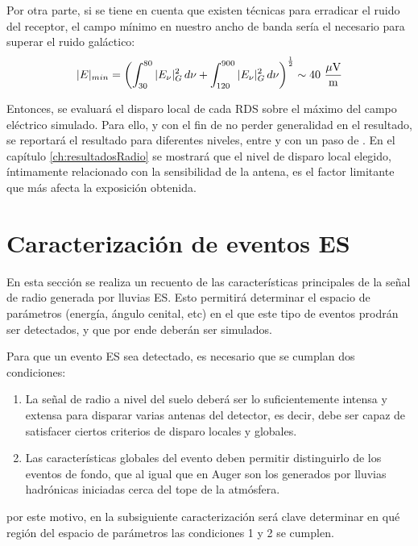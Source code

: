 	Por otra parte, si se tiene en cuenta que existen t\'ecnicas para erradicar el ruido del receptor, el campo m\'inimo en nuestro ancho de banda ser\'ia el necesario para superar el ruido gal\'actico:
	\begin{equation}
	|E|_{min}=\left(\int_{30}^{80}|E_\nu|^2_G \,d\nu+
	\int_{120}^{900}|E_\nu|^2_G\, d\nu
	\right)^\frac{1}{2}
	\sim 40 {\rm\ \dfrac{\mu V}{m}}
	\end{equation}
	
	Entonces, se evaluar\'a el disparo local de cada RDS sobre el m\'aximo del campo el\'ectrico simulado.
	Para ello, y con el fin de no perder generalidad en el resultado, se reportar\'a el resultado para diferentes niveles, entre  y  con un paso de .
	En el cap\'itulo \ref{ch:resultadosRadio} se mostrar\'a que el nivel de disparo local elegido, \'intimamente relacionado con la sensibilidad de la antena, es el factor limitante que m\'as afecta la exposici\'on obtenida.
	
	
\section{Caracterizaci\'on de eventos ES}

En esta secci\'on se realiza un recuento de las caracter\'isticas principales de la se\~nal de radio generada por lluvias ES.
Esto permitir\'a determinar el espacio de par\'ametros (energ\'ia, \'angulo cenital, etc) en el que este tipo de eventos prodr\'an ser detectados, y que por ende deber\'an ser simulados.

Para que un evento ES sea detectado, es necesario que se cumplan dos condiciones:
\begin{enumerate}
 \item La se\~nal de radio a nivel del suelo deber\'a ser lo suficientemente intensa y extensa para disparar varias antenas del detector, es decir, debe ser capaz de satisfacer ciertos criterios de disparo locales y globales.
 \item Las caracter\'isticas globales del evento deben permitir distinguirlo de los eventos de fondo, que al igual que en Auger son los generados por lluvias hadr\'onicas iniciadas cerca del tope de la atm\'osfera.
\end{enumerate}
por este motivo, en la subsiguiente caracterizaci\'on ser\'a clave determinar en qu\'e regi\'on del espacio de par\'ametros las condiciones 1 y 2 se cumplen.

